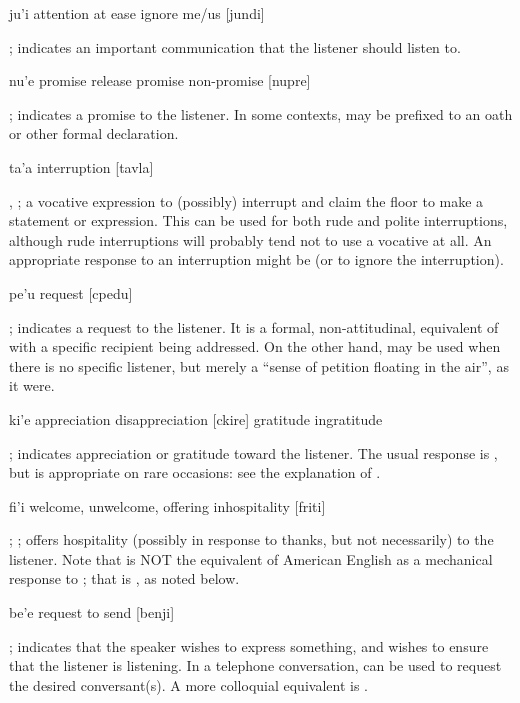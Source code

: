    ju'i    attention   at ease     ignore me/us
            [jundi]

; indicates an
    important communication that the listener should listen to. 

   nu'e    promise     release promise non-promise
            [nupre]

; indicates a promise to the listener. In some
    contexts,  may be prefixed to an oath or other formal
    declaration. 

   ta'a    interruption
            [tavla]

, ; a vocative
    expression to (possibly) interrupt and claim the floor to make
    a statement or expression. This can be used for both rude and
    polite interruptions, although rude interruptions will probably
    tend not to use a vocative at all. An appropriate response to
    an interruption might be  (or  to ignore the
    interruption). 

   pe'u    request
            [cpedu]

; indicates a request to the listener. It is a
    formal, non-attitudinal, equivalent of  with a specific
    recipient being addressed. On the other hand,  may be
    used when there is no specific listener, but merely a ``sense
    of petition floating in the air'', as it were. 

   ki'e    appreciation                disappreciation
            [ckire]
        gratitude           ingratitude

; indicates appreciation or gratitude toward
    the listener. The usual response is , but  is
    appropriate on rare occasions: see the explanation of .

   fi'i    welcome,        unwelcome,
        offering        inhospitality
            [friti]

; ; offers
    hospitality (possibly in response to thanks, but not
    necessarily) to the listener. Note that  is NOT the
    equivalent of American English  as a
    mechanical response to ; that is , as
    noted below. 

   be'e    request to send
            [benji]

; indicates that the speaker wishes to
    express something, and wishes to ensure that the listener is
    listening. In a telephone conversation, can be used to request
    the desired conversant(s). A more colloquial equivalent is
    . 

